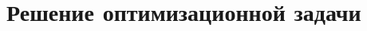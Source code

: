 \documentclass[12pt,a4paper]{article}
\begin{document}

	\section{Решение оптимизационной задачи} 
	
	\newpage
\end{document}
